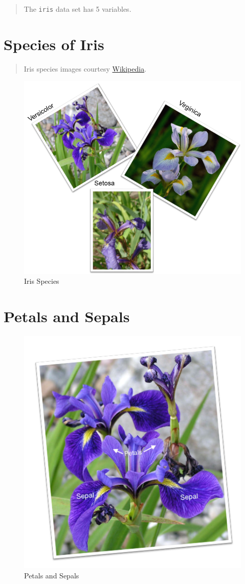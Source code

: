 \documentclass[
]{article}
\begin{document}
\begin{quote}
The \texttt{iris} data set has 5 variables.
\end{quote}

\hypertarget{species-of-iris}{%
\section{Species of Iris}\label{species-of-iris}}

\begin{quote}
Iris species images courtesy
\href{https://www.wikipedia.org/}{Wikipedia}.
\end{quote}

\begin{figure}
\centering
\includegraphics[width=0.75\linewidth]{iris-species.png}
\caption{Iris Species}
\end{figure}

\hypertarget{petals-and-sepals}{%
\section{Petals and Sepals}\label{petals-and-sepals}}

\begin{figure}
\centering
\includegraphics[width=0.75\linewidth]{petal-sepal.png}
\caption{Petals and Sepals}
\end{figure}
\end{document}
